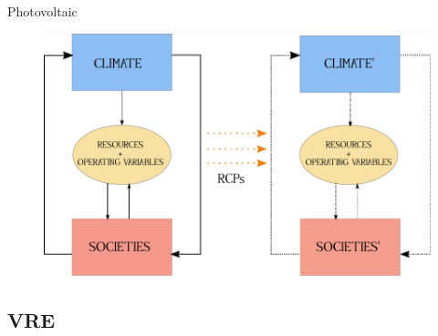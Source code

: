 \documentclass{beamer}%
\begin{document}
\begin{frame}[fragile]{Photovoltaic}
\begin{figure}
\centering\includegraphics[scale=0.3]{drawing.pdf}
\end{figure}
\end{frame}


\subsection{VRE}
 

 
\end{document}
